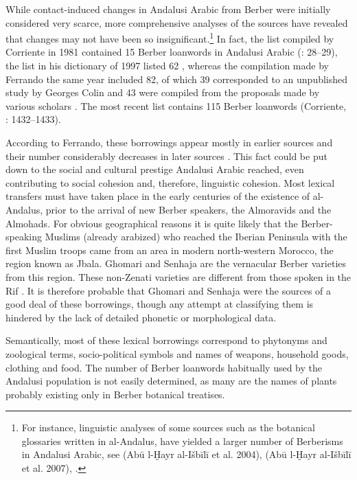 \documentclass[output=paper,modfonts,nonflat]{langsci/langscibook}
\begin{document}
While contact-induced changes in Andalusi Arabic from Berber were initially considered very scarce, more comprehensive analyses of the sources have revealed that changes may not have been so insignificant.\footnote{For instance, linguistic analyses of some sources such as the botanical glossaries written in al-Andalus, have yielded a larger number of Berberisms in Andalusi Arabic, see (Abū l-Ḫayr al-Išbīlī et al. 2004), (Abū l-Ḫayr al-Išbīlī et al. 2007), \citep{Corriente2012}.} In fact, the list compiled by Corriente in 1981 contained 15 Berber loanwords in Andalusi Arabic (\citealt{Corriente1981}: 28–29), the list in his dictionary of 1997 listed 62 \citep[590]{Corriente1997b}, whereas the compilation made by Ferrando the same year included 82, of which 39 corresponded to an unpublished study by Georges Colin and 43 were compiled from the proposals made by various scholars \citep[133]{Ferrando1997}. The most recent list contains 115 Berber loanwords (Corriente, \citealt{PereiraVicente2017}: 1432–1433).

According to Ferrando, these borrowings appear mostly in earlier sources and their number considerably decreases in later sources \citep[140]{Ferrando1997}. This fact could be put down to the social and cultural prestige Andalusi Arabic reached, even contributing to social cohesion and, therefore, linguistic cohesion. Most lexical transfers must have taken place in the early centuries of the existence of al-Andalus, prior to the arrival of new Berber speakers, the Almoravids and the Almohads. For obvious geographical reasons it is quite likely that the Berber-speaking Muslims (already arabized) who reached the Iberian Peninsula with the first Muslim troops came from an area in modern north-western Morocco, the region known as Jbala. Ghomari and Senhaja are the vernacular Berber varieties from this region. These non-Zenati varieties are different from those spoken in the Rif \citep{Kossmann2017}. It is therefore probable that Ghomari and Senhaja were the sources of a good deal of these borrowings, though any attempt at classifying them is hindered by the lack of detailed phonetic or morphological data. 

Semantically, most of these lexical borrowings correspond to phytonyms and zoological terms, socio-political symbols and names of weapons, household goods, clothing and food. The number of Berber loanwords habitually used by the Andalusi population is not easily determined, as many are the names of plants probably existing only in Berber botanical treatises. 
\end{document}
